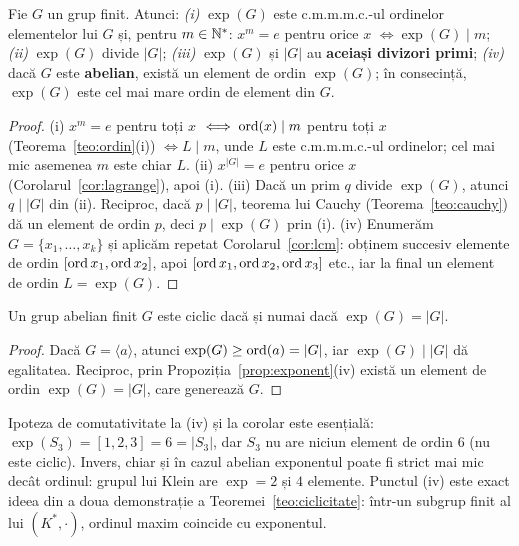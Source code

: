 \begin{propozitie}\label{prop:exponent}
Fie $G$ un grup finit. Atunci:
\emph{(i)} $\exp(G)$ este c.m.m.m.c.-ul ordinelor elementelor lui $G$ și, pentru $m\in\mathbb{N}^*$: $x^m=e$ pentru orice $x$ $\iff\exp(G)\mid m$;
\emph{(ii)} $\exp(G)$ divide $|G|$;
\emph{(iii)} $\exp(G)$ și $|G|$ au \textbf{aceiași divizori primi};
\emph{(iv)} dacă $G$ este \textbf{abelian}, există un element de ordin $\exp(G)$; în consecință, $\exp(G)$ este cel mai mare ordin de element din $G$.
\end{propozitie}

\begin{proof}
(i) $x^m=e$ pentru toți $x$ $\iff\operatorname{ord}(x)\mid m$ pentru toți $x$ (Teorema~\ref{teo:ordin}(i)) $\iff L\mid m$, unde $L$ este c.m.m.m.c.-ul ordinelor; cel mai mic asemenea $m$ este chiar $L$.
(ii) $x^{|G|}=e$ pentru orice $x$ (Corolarul~\ref{cor:lagrange}), apoi (i).
(iii) Dacă un prim $q$ divide $\exp(G)$, atunci $q\mid|G|$ din (ii). Reciproc, dacă $p\mid|G|$, teorema lui Cauchy (Teorema~\ref{teo:cauchy}) dă un element de ordin $p$, deci $p\mid\exp(G)$ prin (i).
(iv) Enumerăm $G=\{x_1,\dots,x_k\}$ și aplicăm repetat Corolarul~\ref{cor:lcm}: obținem succesiv elemente de ordin $[\operatorname{ord} x_1,\operatorname{ord} x_2]$, apoi $[\operatorname{ord} x_1,\operatorname{ord} x_2,\operatorname{ord} x_3]$ etc., iar la final un element de ordin $L=\exp(G)$.
\end{proof}

\begin{corolar}\label{cor:expciclic}
Un grup abelian finit $G$ este ciclic dacă și numai dacă $\exp(G)=|G|$.
\end{corolar}

\begin{proof}
Dacă $G=\langle a\rangle$, atunci $\exp(G)\ge\operatorname{ord}(a)=|G|$, iar $\exp(G)\mid|G|$ dă egalitatea. Reciproc, prin Propoziția~\ref{prop:exponent}(iv) există un element de ordin $\exp(G)=|G|$, care generează $G$.
\end{proof}

\begin{observatie}
Ipoteza de comutativitate la (iv) și la corolar este esențială: $\exp(S_3)=[1,2,3]=6=|S_3|$, dar $S_3$ nu are niciun element de ordin $6$ (nu este ciclic). Invers, chiar și în cazul abelian exponentul poate fi strict mai mic decât ordinul: grupul lui Klein are $\exp=2$ și $4$ elemente. Punctul (iv) este exact ideea din a doua demonstrație a Teoremei~\ref{teo:ciclicitate}: într-un subgrup finit al lui $(K^*,\cdot)$, ordinul maxim coincide cu exponentul.
\end{observatie}

